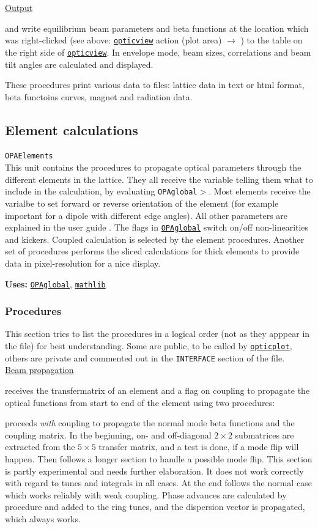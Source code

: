 \documentclass[12pt]{article}
\newcommand\code[1]{{\tt #1}}
\newcommand{\ofldx}[1]{\colorbox{black!15}{(#1)}}
\newcommand\guico[1]{{\color{blue}\code{#1}}}
\newcommand{\unico}[1]{{\color{burntorange}\code{#1}}}
\newcommand{\evcodx}[2]{\ofldx{#1} $\rightarrow$ \guico{#2}}
\newcommand{\prcod}[2]{\opauni{#1}$>$\unico{#2}}
\newcommand{\opagui}[1]{\colorbox{blue!20}{\code{#1}}}
\newcommand{\ogui}[1]{\hyperref[#1]{\opagui{#1}}}
\newcommand{\opauni}[1]{\colorbox{orange!30}{\code{#1}}}
\newcommand{\ounih}[2]{\subsection{\label{#2}#1}{\Huge\opauni{#2}}\\}
\newcommand{\ouni}[1]{\hyperref[#1]{\opauni{#1}}}
\newcommand{\uses}[1]{{\bf Uses: } #1}
\newcommand{\desc}[1]{#1}
\newcommand{\todo}[1]{{\color{red} #1}}
\begin{document}
{\underline{Output}

\unico{FillBeamTab} and \unico{FillBetaTab} write equilibrium beam parameters and beta functions at the location which was right-clicked (see above: \ogui{opticview} action \evcodx{plot area}{pwMouseDown}) to the table on the right side of \ogui{opticview}. In envelope mode, beam sizes, correlations and beam tilt angles are calculated and displayed. 

\unico{Print\dots} These procedures print various data to files: lattice data in text or html format, beta functoins curves, magnet and radiation data.
}

\ounih{Element calculations}{OPAElements} 

\desc{This unit contains the procedures to propagate optical parameters through the different elements in the lattice. They all receive the variable \unico{mode} telling them what to include in the calculation, by evaluating \prcod{OPAglobal}{switch}. Most elements receive the varialbe \unico{idir} to set forward or reverse orientation of the element (for example important for a dipole with different edge angles). All other parameters are explained in the user guide \cite{userguide}. 
The flags \unico{UseSext,UsePulsed} in \ouni{OPAglobal} switch on/off non-linearities and kickers. Coupled calculation is selected by the element procedures. Another set of procedures performs the sliced calculations for thick elements to provide data in pixel-resolution for a nice display. 
}

\uses{\ouni{OPAglobal}, \ouni{mathlib}}

\subsubsection*{Procedures}

This section tries to list the procedures in a logical order (not as they apppear in the file) for best understanding. Some are public, to be called by \ouni{opticplot}, others are private and commented out in the \code{INTERFACE} section of the file.\\

\underline{Beam propagation}

\unico{Propagate} receives the transfermatrix of an element and a flag on coupling to propagate the optical functions from start to end of the element using two procedures:

\unico{MCC\_prop} proceeds {\em with} coupling to propagate the normal mode beta functions and the coupling matrix. In the beginning, on- and off-diagonal $2\times 2$ submatrices are extracted from the $5\times 5$ transfer matrix, and a test is done, if a mode flip will happen. Then follows a longer section to handle a possible mode flip. \todo{This section is partly experimental and needs further elaboration. It does not work correctly with regard to tunes and integrals in all cases.} At the end follows the normal case which works reliably with weak coupling. Phase advances are calculated by procedure \unico{PhaseAdvance} and added to the ring tunes, and the dispersion vector is propagated, which always works.
\end{document}
